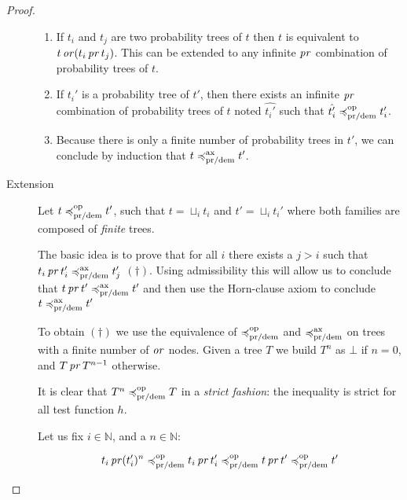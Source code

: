 \begin{proof}
\begin{description}
\begin{enumerate}
        \item 
            If $t_i$ and $t_j$ are two 
            probability trees of $t$ 
            then $t$ is equivalent to 
            $t \operatorname{\mathit{or}} (t_i \operatorname{\mathit{pr}} t_j)$.
            This can be extended to any infinite 
            $\operatorname{\mathit{pr}}$ combination 
            of probability trees of $t$.

        \item 
            If $t_i'$ is a probability tree of $t'$,
            then there exists an infinite $\operatorname{\mathit{pr}}$
            combination of probability trees of $t$
            noted $\hat{t_i'}$
            such that $\hat{t_i'} \preccurlyeq^{\text{op}}_{\text{pr/dem}} t_i'$.

        \item Because there is only a finite number 
            of probability trees in $t'$, we can 
            conclude by induction that 
            $t \preccurlyeq^{\text{ax}}_{\text{pr/dem}} t'$.
    \end{enumerate}


        \item[Extension]
    Let $t \preccurlyeq^{\text{op}}_{\text{pr/dem}} t'$,
    such that $t = \sqcup_i t_i$ and $t' = \sqcup_i t_i'$ 
    where both families are composed of \emph{finite} trees.

    The basic idea is to prove that for all $i$ there exists 
    a $j > i$ such that
    $t_i \operatorname{\mathit{pr}} t_i' \preccurlyeq^{\text{ax}}_{\text{pr/dem}} t_j'$ $(\dagger)$. Using admissibility
    this will allow us to conclude that $t \operatorname{\mathit{pr}} t' \preccurlyeq^{\text{ax}}_{\text{pr/dem}} t'$
    and then use the Horn-clause axiom to conclude $t \preccurlyeq^{\text{ax}}_{\text{pr/dem}} t'$

    To obtain $(\dagger)$ we use the equivalence of $\preccurlyeq^{\text{op}}_{\text{pr/dem}}$
    and $\preccurlyeq^{\text{ax}}_{\text{pr/dem}}$ on trees with a finite number of $\operatorname{\mathit{or}}$ nodes.
    Given a tree $T$ we build $T^n$ as $\bot$ if $n = 0$, and $T \operatorname{\mathit{pr}} T^{n-1}$
    otherwise. 

    It is clear that $T^n \preccurlyeq^{\text{op}}_{\text{pr/dem}} T$ in a \emph{strict fashion}:
    the inequality is strict for all test function $h$.

    Let us fix $i \in \mathbb{N}$, and a $n \in \mathbb{N}$: 

    \begin{equation*}
        t_i \operatorname{\mathit{pr}} (t_i')^n \preccurlyeq^{\text{op}}_{\text{pr/dem}} t_i \operatorname{\mathit{pr}} t_i'
        \preccurlyeq^{\text{op}}_{\text{pr/dem}} t \operatorname{\mathit{pr}} t' \preccurlyeq^{\text{op}}_{\text{pr/dem}} t'
    \end{equation*}


\end{description}
\end{proof}
